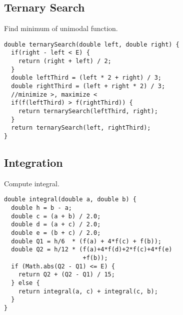 \subsection{Ternary Search}

Find minimum of unimodal function. \\

\begin{lstlisting}
double ternarySearch(double left, double right) {
  if(right - left < E) {
    return (right + left) / 2;
  }
  double leftThird = (left * 2 + right) / 3;
  double rightThird = (left + right * 2) / 3;
  //minimize >, maximize <
  if(f(leftThird) > f(rightThird)) { 
    return ternarySearch(leftThird, right);
  }			   
  return ternarySearch(left, rightThird);
}
\end{lstlisting}

\subsection{Integration}

Compute integral. \\

\begin{lstlisting}
double integral(double a, double b) {
  double h = b - a;
  double c = (a + b) / 2.0;
  double d = (a + c) / 2.0;
  double e = (b + c) / 2.0;
  double Q1 = h/6  * (f(a) + 4*f(c) + f(b));
  double Q2 = h/12 * (f(a)+4*f(d)+2*f(c)+4*f(e)  
                      +f(b));
  if (Math.abs(Q2 - Q1) <= E) {
    return Q2 + (Q2 - Q1) / 15;
  } else {        	
    return integral(a, c) + integral(c, b);
  }
}
\end{lstlisting}
